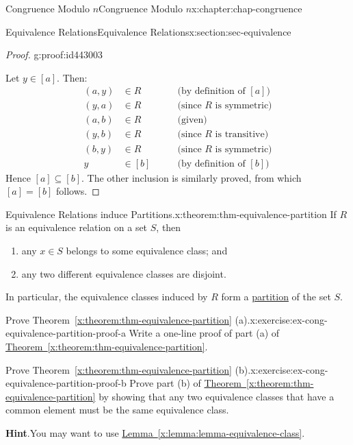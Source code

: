 \documentclass[oneside,10pt,]{book}
\newcommand{\blocktitlefont}{\relax}
\newcommand{\xreffont}{\relax}
\numberwithin{equation}{section}
\newcommand{\amp}{&}
\begin{document}
\begin{chapterptx}{Congruence Modulo \(n\)}{}{Congruence Modulo \(n\)}{}{}{x:chapter:chap-congruence}
\begin{sectionptx}{Equivalence Relations}{}{Equivalence Relations}{}{}{x:section:sec-equivalence}
\begin{proof}{}{g:proof:id443003}
\par
Let \(y \in [a]\). Then:%
\begin{align*}
(a,y) \amp \in R \qquad \amp \text{(by definition of $[a]$)}\\
(y,a) \amp \in R \qquad \amp \text{(since $R$ is symmetric)}\\
(a,b) \amp \in R \qquad \amp \text{(given)}\\
(y,b) \amp \in R \qquad \amp \text{(since $R$ is transitive)}\\
(b,y) \amp \in R \qquad \amp \text{(since $R$ is symmetric)}\\
y \amp \in [b] \qquad \amp \text{(by definition of $[b]$)}
\end{align*}
Hence \([a] \subseteq [b]\). The other inclusion is similarly proved, from which \([a] = [b]\) follows.%
\end{proof}
\begin{theorem}{Equivalence Relations induce Partitions.}{}{x:theorem:thm-equivalence-partition}%
If \(R\) is an equivalence relation on a set \(S\), then%
\begin{enumerate}[label=(\alph*)]
\item{}any \(x \in S\) belongs to some equivalence class; and%
\item{}any two different equivalence classes are disjoint.%
\end{enumerate}
In particular, the equivalence classes induced by \(R\) form a \hyperref[x:definition:def-partition]{partition} of the set \(S\).%
\end{theorem}
\begin{inlineexercise}{Prove Theorem~{\xreffont\ref*{x:theorem:thm-equivalence-partition}} (a).}{x:exercise:ex-cong-equivalence-partition-proof-a}%
Write a one-line proof of part (a) of \hyperref[x:theorem:thm-equivalence-partition]{Theorem~{\xreffont\ref{x:theorem:thm-equivalence-partition}}}.%
\end{inlineexercise}
\begin{inlineexercise}{Prove Theorem~{\xreffont\ref*{x:theorem:thm-equivalence-partition}} (b).}{x:exercise:ex-cong-equivalence-partition-proof-b}%
Prove part (b) of \hyperref[x:theorem:thm-equivalence-partition]{Theorem~{\xreffont\ref{x:theorem:thm-equivalence-partition}}} by showing that any two equivalence classes that have a common element must be the same equivalence class.%
\par\smallskip%
\noindent\textbf{\blocktitlefont Hint}.\hypertarget{g:hint:id443618}{}\quad{}You may want to use \hyperref[x:lemma:lemma-equivalence-class]{Lemma~{\xreffont\ref{x:lemma:lemma-equivalence-class}}}.%

\end{inlineexercise}
\end{sectionptx}
\end{chapterptx}
\end{document}
